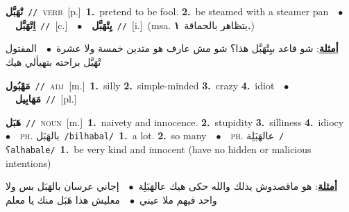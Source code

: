 \documentclass[10pt,a4paper,twoside]{article} %
\begin{document}
\begin{multicols}{2}
{\setlength\topsep{0pt}\textbf{\foreignlanguage{arabic}{تْهَبَّل}}\ {\color{gray}\texttt{//}\color{black}}\ \textsc{verb}\ [p.]\ \textbf{1.}~pretend to be fool.  \textbf{2.}~be steamed with a steamer pan\ \ $\bullet$\ \ \setlength\topsep{0pt}\textbf{\foreignlanguage{arabic}{اِتْهَبَّل}}\ {\color{gray}\texttt{//}\color{black}}\ [c.]\ \ $\bullet$\ \ \setlength\topsep{0pt}\textbf{\foreignlanguage{arabic}{يِتْهَبَّل}}\ {\color{gray}\texttt{//}\color{black}}\ [i.]\ \color{gray}(msa. \foreignlanguage{arabic}{يتظاهر بالحماقة}~\foreignlanguage{arabic}{\textbf{١.}})\color{black}\  \begin{flushright}\color{gray}\foreignlanguage{arabic}{\textbf{\underline{\foreignlanguage{arabic}{أمثلة}}}: شو قاعد بيِتْهَبَّل هذا؟ شو مش عارف هو متدين خمسة ولا عشرة\ $\bullet$\ \  المفتول تْهَبَّل براحته بتهيألي هيك}\end{flushright}\color{black}} \vspace{2mm}

{\setlength\topsep{0pt}\textbf{\foreignlanguage{arabic}{مَهْبُول}}\ {\color{gray}\texttt{//}\color{black}}\ \textsc{adj}\ [m.]\ \textbf{1.}~silly  \textbf{2.}~simple-minded  \textbf{3.}~crazy  \textbf{4.}~idiot\ \ $\bullet$\ \ \setlength\topsep{0pt}\textbf{\foreignlanguage{arabic}{مَهَابِيل}}\ {\color{gray}\texttt{//}\color{black}}\ [pl.]\ } \vspace{2mm}

{\setlength\topsep{0pt}\textbf{\foreignlanguage{arabic}{هَبَل}}\ {\color{gray}\texttt{//}\color{black}}\ \textsc{noun}\ [m.]\ \textbf{1.}~naivety and innocence.  \textbf{2.}~stupidity  \textbf{3.}~silliness  \textbf{4.}~idiocy\ \ $\bullet$\ \ \textsc{ph.} \color{gray} \foreignlanguage{arabic}{بالهَبَل}\color{black}\ {\color{gray}\texttt{/{\sffamily bilhabal}/}\color{black}}\ \textbf{1.}~a lot.  \textbf{2.}~so many\ \ $\bullet$\ \ \textsc{ph.} \color{gray} \foreignlanguage{arabic}{عالهَبَلِة}\color{black}\ {\color{gray}\texttt{/{\sffamily ʕalhabale}/}\color{black}}\ \textbf{1.}~be very kind and innocent (have no hidden or malicious intentions)\  \begin{flushright}\color{gray}\foreignlanguage{arabic}{\textbf{\underline{\foreignlanguage{arabic}{أمثلة}}}: هو ماقصدوش يذلك والله حكى هيك عالهَبَلِة\ $\bullet$\ \  إجاني عرسان بالهَبَل بس ولا واحد فيهم ملا عيني\ $\bullet$\ \  معليش هذا هَبَل منك يا معلم}\end{flushright}\color{black}} \vspace{2mm}


\end{multicols}
\end{document}
